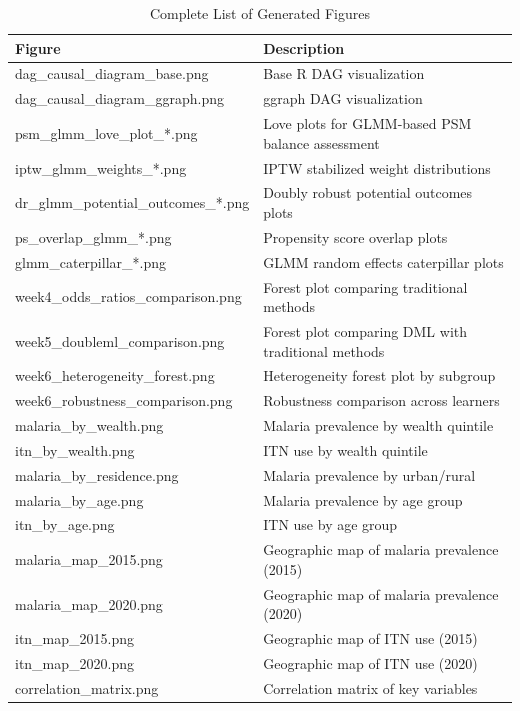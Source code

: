 \begin{table}[htbp]
	\centering
	\caption{Complete List of Generated Figures}
	\label{tab:appendix_figures}
	\begin{tabular}{@{}ll@{}}
		\toprule
		\textbf{Figure} & \textbf{Description} \\
		\midrule
		dag\_causal\_diagram\_base.png & Base R DAG visualization \\
		dag\_causal\_diagram\_ggraph.png & ggraph DAG visualization \\
		psm\_glmm\_love\_plot\_*.png & Love plots for GLMM-based PSM balance assessment \\
		iptw\_glmm\_weights\_*.png & IPTW stabilized weight distributions \\
		dr\_glmm\_potential\_outcomes\_*.png & Doubly robust potential outcomes plots \\
		ps\_overlap\_glmm\_*.png & Propensity score overlap plots \\
		glmm\_caterpillar\_*.png & GLMM random effects caterpillar plots \\
		week4\_odds\_ratios\_comparison.png & Forest plot comparing traditional methods \\
		week5\_doubleml\_comparison.png & Forest plot comparing DML with traditional methods \\
		week6\_heterogeneity\_forest.png & Heterogeneity forest plot by subgroup \\
		week6\_robustness\_comparison.png & Robustness comparison across learners \\
		malaria\_by\_wealth.png & Malaria prevalence by wealth quintile \\
		itn\_by\_wealth.png & ITN use by wealth quintile \\
		malaria\_by\_residence.png & Malaria prevalence by urban/rural \\
		malaria\_by\_age.png & Malaria prevalence by age group \\
		itn\_by\_age.png & ITN use by age group \\
		malaria\_map\_2015.png & Geographic map of malaria prevalence (2015) \\
		malaria\_map\_2020.png & Geographic map of malaria prevalence (2020) \\
		itn\_map\_2015.png & Geographic map of ITN use (2015) \\
		itn\_map\_2020.png & Geographic map of ITN use (2020) \\
		correlation\_matrix.png & Correlation matrix of key variables \\
		\bottomrule
	\end{tabular}
\end{table}

